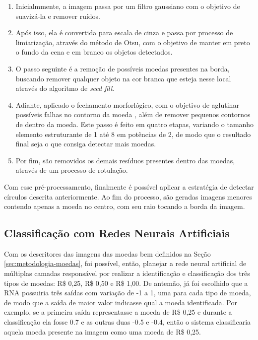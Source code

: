 \documentclass[10pt,journal,compsoc]{IEEEtran}
\begin{document}
\begin{enumerate}

\item Inicialmmente, a imagem passa por um filtro gaussiano com o objetivo de suavizá-la e remover ruídos.
\item Após isso, ela é convertida para escala de cinza e passa por processo de limiarização, através do método de Otsu, com o objetivo de manter em preto o fundo da cena e em branco os objetos detectados.
\item O passo seguinte é a remoção de possíveis moedas presentes na borda, buscando remover qualquer objeto na cor branca que esteja nesse local através do algoritmo de \textit{seed fill}.
\item Adiante, aplicado o fechamento morforlógico, com o objetivo de aglutinar possíveis falhas no contorno da moeda , além de remover pequenos contornos de dentro da moeda. Este passo é feito em quatro etapas, variando o tamanho elemento estruturante de 1 até 8 em potências de 2, de modo que o resultado final seja o que consiga detectar mais moedas.
\item Por fim, são removidos os demais resíduos presentes dentro das moedas, através de um processo de rotulação. 
\end{enumerate}

Com esse pré-processamento, finalmente é possível aplicar a estratégia de detectar círculos descrita anteriormente. Ao fim do processo, são geradas imagens menores contendo apenas a moeda no centro, com seu raio tocando a borda da imagem.

\subsection{Classificação com Redes Neurais Artificiais}
\label{sec:metodologia-rna}


Com os descritores das imagens das moedas bem definidos na Seção \ref{sec:metodologia-moedas}, foi possível, então, planejar a rede neural artificial de múltiplas camadas responsável por realizar a identificação e classificação dos três tipos de moedas: R\$ 0,25, R\$ 0,50 e R\$ 1,00. De antemão, já foi escolhido que a RNA possuiria três saídas com variação de -1 a 1, uma para cada tipo de moeda, de modo que a saída de maior valor indicasse qual a moeda identificada. Por exemplo, se a primeira saída representasse a moeda de R\$ 0,25 e durante a classificação ela fosse 0.7 e as outras duas -0.5 e -0.4, então o sistema classificaria aquela moeda presente na imagem como uma moeda de R\$ 0,25.
\end{document}
